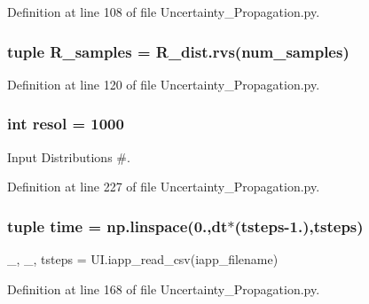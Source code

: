 Definition at line 108 of file Uncertainty\-\_\-\-Propagation.\-py.

\hypertarget{namespace_uncertainty___propagation_a48a93972bddd620b71755a37ec6f337b}{
\subsubsection[{R\-\_\-samples}]{\setlength{\rightskip}{0pt plus 5cm}tuple R\-\_\-samples = R\-\_\-dist.\-rvs({\bf num\-\_\-samples})}}\label{namespace_uncertainty___propagation_a48a93972bddd620b71755a37ec6f337b}


Definition at line 120 of file Uncertainty\-\_\-\-Propagation.\-py.

\hypertarget{namespace_uncertainty___propagation_a4737e7c4408908bc86898057096fd8bf}{
\subsubsection[{resol}]{\setlength{\rightskip}{0pt plus 5cm}int resol = 1000}}\label{namespace_uncertainty___propagation_a4737e7c4408908bc86898057096fd8bf}


Input Distributions \#. 



Definition at line 227 of file Uncertainty\-\_\-\-Propagation.\-py.

\hypertarget{namespace_uncertainty___propagation_a429c35172fbcb8b1788bead147e4719b}{
\subsubsection[{time}]{\setlength{\rightskip}{0pt plus 5cm}tuple time = np.\-linspace(0.,dt$\ast$(tsteps-\/1.),tsteps)}}\label{namespace_uncertainty___propagation_a429c35172fbcb8b1788bead147e4719b}


\-\_\-, \-\_\-, tsteps = U\-I.\-iapp\-\_\-read\-\_\-csv(iapp\-\_\-filename) 



Definition at line 168 of file Uncertainty\-\_\-\-Propagation.\-py.

